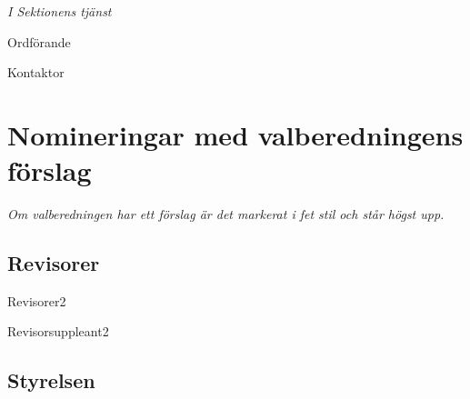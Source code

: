 \documentclass[10pt]{article}
\def\ordf{Erik Månsson}
\def\sekr{Johan Karlberg}
\begin{document}
\begin{signatures}{2}
    \emph{I Sektionens tjänst}
    \signature{\ordf}{Ordförande}
    \signature{\sekr}{Kontaktor}
\end{signatures}

\section{Nomineringar med valberedningens förslag}
\emph{Om valberedningen har ett förslag är det markerat i fet stil och står högst upp.}

\subsection{Revisorer}

\begin{vallista}
    \begin{post}{Revisorer}{2}
        \vakant
    \end{post}
    \begin{post}{Revisorsuppleant}{2}
        \vakant
    \end{post}
\end{vallista}

\subsection{Styrelsen}
\end{document}
